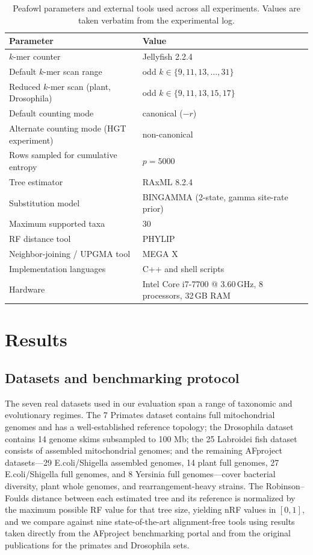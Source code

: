 \documentclass[11pt]{article}
\begin{document}
\begin{table}[htbp]
\centering
\caption{Peafowl parameters and external tools used across all experiments.
Values are taken verbatim from the experimental log.}
\label{tab:params}
\begin{tabular}{ll}
\toprule
Parameter & Value \\
\midrule
$k$-mer counter & Jellyfish 2.2.4 \citep{marcais2011jellyfish} \\
Default $k$-mer scan range & odd $k \in \{9, 11, 13, \ldots, 31\}$ \\
Reduced $k$-mer scan (plant, Drosophila) & odd $k \in \{9, 11, 13, 15, 17\}$ \\
Default counting mode & canonical ($-r$) \\
Alternate counting mode (HGT experiment) & non-canonical \\
Rows sampled for cumulative entropy & $p = 5000$ \\
Tree estimator & RAxML 8.2.4 \citep{stamatakis2014raxml} \\
Substitution model & BINGAMMA (2-state, gamma site-rate prior) \\
Maximum supported taxa & 30 \\
RF distance tool & PHYLIP \citep{felsenstein1989phylip} \\
Neighbor-joining / UPGMA tool & MEGA X \citep{kumar2018megax} \\
Implementation languages & C++ and shell scripts \\
Hardware & Intel Core i7-7700 @ 3.60\,GHz, 8 processors, 32\,GB RAM \\
\bottomrule
\end{tabular}
\end{table}

\section{Results}

\subsection{Datasets and benchmarking protocol}

The seven real datasets used in our evaluation span a range of taxonomic and
evolutionary regimes. The 7 Primates dataset contains full mitochondrial
genomes and has a well-established reference topology; the Drosophila dataset
contains 14 genome skims subsampled to 100 Mb; the 25 Labroidei fish dataset
consists of assembled mitochondrial genomes; and the remaining AFproject
datasets---29 E.coli/Shigella assembled genomes, 14 plant full genomes, 27
E.coli/Shigella full genomes, and 8 Yersinia full genomes---cover bacterial
diversity, plant whole genomes, and rearrangement-heavy strains. The
Robinson--Foulds distance \citep{robinson1981rf} between each estimated
tree and its reference is normalized by the maximum possible RF value for
that tree size, yielding nRF values in $[0, 1]$, and we compare against nine
state-of-the-art alignment-free tools using results taken directly from the
AFproject benchmarking portal and from the original publications for the
primates and Drosophila sets.
\end{document}
